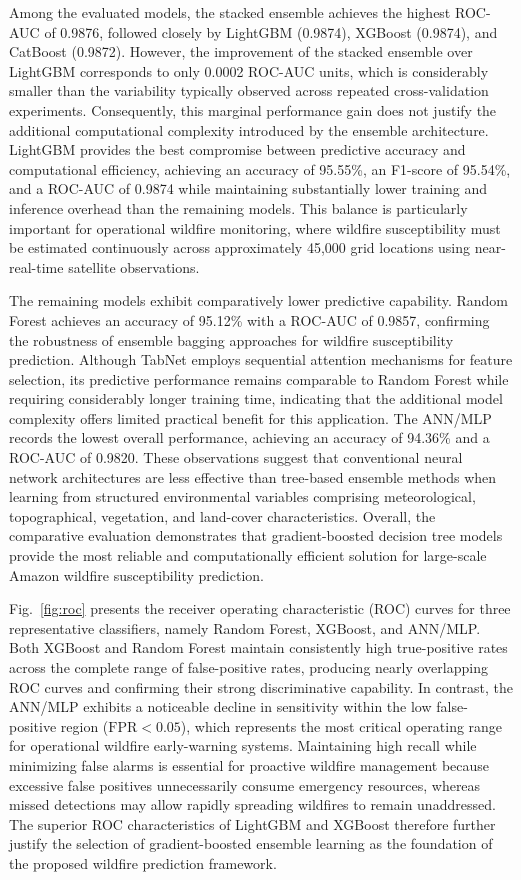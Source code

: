 \documentclass{ieeeaccess}
\begin{document}
Among the evaluated models, the stacked ensemble achieves the highest ROC-AUC of 0.9876, followed closely by LightGBM (0.9874), XGBoost (0.9874), and CatBoost (0.9872). However, the improvement of the stacked ensemble over LightGBM corresponds to only 0.0002 ROC-AUC units, which is considerably smaller than the variability typically observed across repeated cross-validation experiments. Consequently, this marginal performance gain does not justify the additional computational complexity introduced by the ensemble architecture. LightGBM provides the best compromise between predictive accuracy and computational efficiency, achieving an accuracy of 95.55\%, an F1-score of 95.54\%, and a ROC-AUC of 0.9874 while maintaining substantially lower training and inference overhead than the remaining models. This balance is particularly important for operational wildfire monitoring, where wildfire susceptibility must be estimated continuously across approximately 45,000 grid locations using near-real-time satellite observations.

The remaining models exhibit comparatively lower predictive capability. Random Forest achieves an accuracy of 95.12\% with a ROC-AUC of 0.9857, confirming the robustness of ensemble bagging approaches for wildfire susceptibility prediction. Although TabNet employs sequential attention mechanisms for feature selection, its predictive performance remains comparable to Random Forest while requiring considerably longer training time, indicating that the additional model complexity offers limited practical benefit for this application. The ANN/MLP records the lowest overall performance, achieving an accuracy of 94.36\% and a ROC-AUC of 0.9820. These observations suggest that conventional neural network architectures are less effective than tree-based ensemble methods when learning from structured environmental variables comprising meteorological, topographical, vegetation, and land-cover characteristics. Overall, the comparative evaluation demonstrates that gradient-boosted decision tree models provide the most reliable and computationally efficient solution for large-scale Amazon wildfire susceptibility prediction.

Fig.~\ref{fig:roc} presents the receiver operating characteristic (ROC) curves for three representative classifiers, namely Random Forest, XGBoost, and ANN/MLP. Both XGBoost and Random Forest maintain consistently high true-positive rates across the complete range of false-positive rates, producing nearly overlapping ROC curves and confirming their strong discriminative capability. In contrast, the ANN/MLP exhibits a noticeable decline in sensitivity within the low false-positive region ($\text{FPR}<0.05$), which represents the most critical operating range for operational wildfire early-warning systems. Maintaining high recall while minimizing false alarms is essential for proactive wildfire management because excessive false positives unnecessarily consume emergency resources, whereas missed detections may allow rapidly spreading wildfires to remain unaddressed. The superior ROC characteristics of LightGBM and XGBoost therefore further justify the selection of gradient-boosted ensemble learning as the foundation of the proposed wildfire prediction framework.
\end{document}
